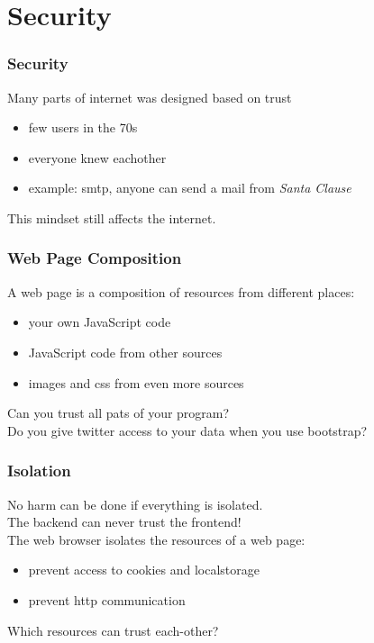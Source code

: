 \section{Security}
\begin{frame}[fragile] \frametitle{Security}
Many parts of internet was designed based on trust
\begin{itemize}
  \item few users in the 70s
  \item everyone knew eachother
  \item example: smtp, anyone can send a mail from \emph{Santa Clause}
\end{itemize}
\vspace{5mm}
This mindset still affects the internet.
\end{frame}

\begin{frame}[fragile] \frametitle{Web Page Composition}
A web page is a composition of resources from different places:
\begin{itemize}
  \item your own JavaScript code
  \item JavaScript code from other sources
  \item images and css from even more sources
\end{itemize}
\vspace{5mm}
Can you trust all pats of your program?
\vspace{5mm}
\\Do you give twitter access to your data when you use bootstrap?
\end{frame}

\begin{frame}[fragile] \frametitle{Isolation}
No harm can be done if everything is isolated.
\vspace{5mm}
\\The backend can never trust the frontend!
\vspace{5mm}
\\The web browser isolates the resources of a web page:
\begin{itemize}
  \item prevent access to cookies and localstorage
  \item prevent http communication
\end{itemize}
\vspace{5mm}
Which resources can trust each-other?
\end{frame}

